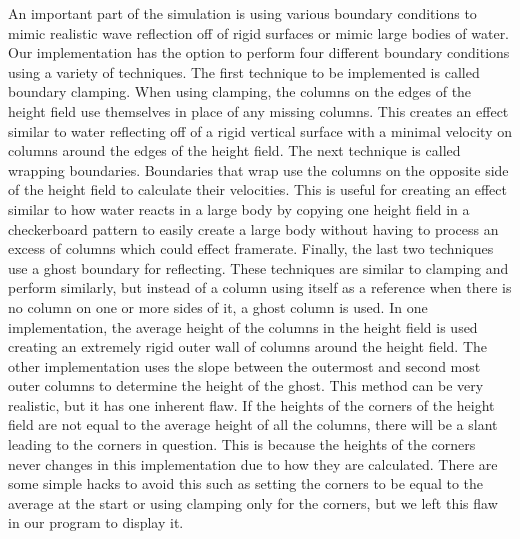 \documentclass[12pt,titlepage]{article}
\begin{document}
An important part of the simulation is using various boundary conditions to 
mimic realistic wave reflection off of rigid surfaces or mimic large bodies of 
water. Our implementation has the option to perform four different boundary 
conditions using a variety of techniques. The first technique to be implemented 
is called boundary clamping. When using clamping, the columns on the edges of 
the height field use themselves in place of any missing columns. This creates 
an effect similar to water reflecting off of a rigid vertical surface with a 
minimal velocity on columns around the edges of the height field. The next 
technique is called wrapping boundaries. Boundaries that wrap use the columns 
on the opposite side of the height field to calculate their velocities. This is 
useful for creating an effect similar to how water reacts in a large body by 
copying one height field in a checkerboard pattern to easily create a large 
body without having to process an excess of columns which could effect 
framerate. Finally, the last two techniques use a ghost boundary for 
reflecting. These techniques are similar to clamping and perform similarly, but 
instead of a column using itself as a reference when there is no column on one 
or more sides of it, a ghost column is used. In one implementation, the average 
height of the columns in the height field is used creating an extremely rigid 
outer wall of columns around the height field. The other implementation uses 
the slope between the outermost and second most outer columns to determine the 
height of the ghost. This method can be very realistic, but it has one inherent 
flaw. If the heights of the corners of the height field are not equal to the 
average height of all the columns, there will be a slant leading to the corners 
in question. This is because the heights of the corners never changes in this 
implementation due to how they are calculated. There are some simple hacks to 
avoid this such as setting the corners to be equal to the average at the start 
or using clamping only for the corners, but we left this flaw in our program to 
display it.
\end{document}
